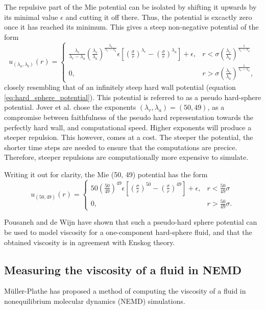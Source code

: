 The repulsive part of the Mie potential can be isolated by shifting it 
upwards by its minimal value $\epsilon$ and cutting it off there. 
Thus, the potential is excactly zero once it has reached its minimum.
This gives a steep non-negative potential of the form
\begin{equation}
    u_{(\lambda_a, \lambda_b)}(r) = 
    \begin{cases}
        \frac{\lambda_r}{\lambda_r - \lambda_a}
        \left(\frac{\lambda_r}{\lambda_a}\right)
        ^{\frac{\lambda_a}{\lambda_r - \lambda_a}}
        \epsilon \left[
            \left(\frac{\sigma}{r}\right)^{\lambda_r} -
            \left(\frac{\sigma}{r}\right)^{\lambda_a}
        \right]
        + \epsilon,
            & r < \sigma \left(
                \frac{\lambda_r}{\lambda_a}
            \right)^\frac{1}{\lambda_r - \lambda_a} \\
        0,  & r > \sigma \left(
                \frac{\lambda_r}{\lambda_a}
            \right)^\frac{1}{\lambda_r - \lambda_a},
    \end{cases}
\end{equation}
closely resembling that of an infinitely steep hard wall potential (equation \eqref{eq:hard_sphere_potential}).
This potential is referred to as a pseudo hard-sphere potential.
Jover et al. chose the exponents $(\lambda_r, \lambda_a) = (50, 49)$, 
as a compromise between faithfulness of the pseudo hard representation 
towards the perfectly hard wall, and computational speed.
Higher exponents will produce a steeper repulsion. 
This however, comes at a cost. 
The steeper the potential, the shorter time steps are needed to ensure that the computations are precice.
Therefore, steeper repulsions are computationally more expensive to simulate.

Writing it out for clarity, the Mie (50, 49) potential has the form
\begin{equation}
    u_{(50, 49)}(r) = 
    \begin{cases}
        50
        \left(\frac{50}{49}\right)
        ^{49}
        \epsilon \left[
            \left(\frac{\sigma}{r}\right)^{50} -
            \left(\frac{\sigma}{r}\right)^{49}
        \right]
        + \epsilon,
            & r < \frac{50}{49} \sigma\\
        0,  & r > \frac{50}{49} \sigma.
    \end{cases}
\end{equation}

Pousaneh and de Wijn \cite{ref:pousaneh:shear_viscosity} 
have shown that such a pseudo-hard sphere potential 
can be used to model viscosity for a one-component hard-sphere fluid, 
and that the obtained viscosity is in agreement with Enskog theory.

\subsection{Measuring the viscosity of a fluid in NEMD}
Müller-Plathe \cite{ref:muller-plathe:reversing_the_perturbation} 
has proposed a method of computing the viscosity of a fluid in 
nonequilibrium molecular dynamics (NEMD) simulations.
